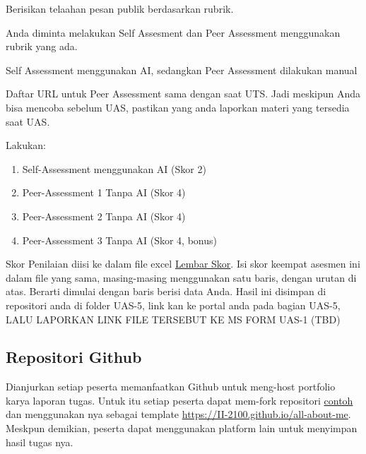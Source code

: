 \documentclass[
  letterpaper,
  DIV=11,
  numbers=noendperiod]{scrreprt}
\providecommand{\tightlist}{%
  \setlength{\itemsep}{0pt}\setlength{\parskip}{0pt}}
\begin{document}
Berisikan telaahan pesan publik berdasarkan rubrik.

Anda diminta melakukan Self Assesment dan Peer Assessment menggunakan
rubrik yang ada.

Self Assessment menggunakan AI, sedangkan Peer Assessment dilakukan
manual

\begin{tcolorbox}[enhanced jigsaw, breakable, rightrule=.15mm, colbacktitle=quarto-callout-warning-color!10!white, opacityback=0, titlerule=0mm, leftrule=.75mm, bottomrule=.15mm, toptitle=1mm, colframe=quarto-callout-warning-color-frame, bottomtitle=1mm, arc=.35mm, coltitle=black, opacitybacktitle=0.6, toprule=.15mm, left=2mm, title=\textcolor{quarto-callout-warning-color}{\faExclamationTriangle}\hspace{0.5em}{Bahan Peer Assignmen Baru VALID Nanti Saat UAS}, colback=white]

Daftar URL untuk Peer Assessment sama dengan saat UTS. Jadi meskipun
Anda bisa mencoba sebelum UAS, pastikan yang anda laporkan materi yang
tersedia saat UAS.

\end{tcolorbox}

Lakukan:

\begin{enumerate}
\def\labelenumi{\arabic{enumi}.}
\tightlist
\item
  Self-Assessment menggunakan AI (Skor 2)
\item
  Peer-Assessment 1 Tanpa AI (Skor 4)
\item
  Peer-Assessment 2 Tanpa AI (Skor 4)
\item
  Peer-Assessment 3 Tanpa AI (Skor 4, bonus)
\end{enumerate}

Skor Penilaian diisi ke dalam file excel
\href{./asesmen/UTS-5_Skor.xlsx}{Lembar Skor}. Isi skor keempat asesmen
ini dalam file yang sama, masing-masing menggunakan satu baris, dengan
urutan di atas. Berarti dimulai dengan baris berisi data Anda. Hasil ini
disimpan di repositori anda di folder UAS-5, link kan ke portal anda
pada bagian UAS-5, LALU LAPORKAN LINK FILE TERSEBUT KE MS FORM UAS-1
(TBD)

\subsection*{Repositori Github}\label{repositori-github}

Dianjurkan setiap peserta memanfaatkan Github untuk meng-host portfolio
karya laporan tugas. Untuk itu setiap peserta dapat mem-fork repositori
\href{https://github.com/II-2100/all-about-me}{contoh} dan menggunakan
nya sebagai template \url{https://II-2100.github.io/all-about-me}.
Meskpun demikian, peserta dapat menggunakan platform lain untuk
menyimpan hasil tugas nya.
\end{document}
